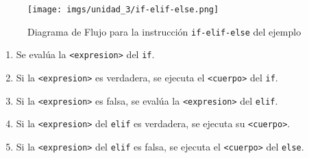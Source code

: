 \documentclass[
  letterpaper,
  DIV=11,
  numbers=noendperiod]{scrreprt}
\providecommand{\tightlist}{%
  \setlength{\itemsep}{0pt}\setlength{\parskip}{0pt}}\usepackage{longtable,booktabs,array}
\begin{document}
\begin{figure}[H]

{\centering \texttt{[image: imgs/unidad\_3/if-elif-else.png]}

}

\caption{Diagrama de Flujo para la instrucción \texttt{if-elif-else} del
ejemplo}

\end{figure}%

\begin{enumerate}
\def\labelenumi{\arabic{enumi}.}
\tightlist
\item
  Se evalúa la \texttt{\textless{}expresion\textgreater{}} del
  \texttt{if}.
\item
  Si la \texttt{\textless{}expresion\textgreater{}} es verdadera, se
  ejecuta el \texttt{\textless{}cuerpo\textgreater{}} del \texttt{if}.
\item
  Si la \texttt{\textless{}expresion\textgreater{}} es falsa, se evalúa
  la \texttt{\textless{}expresion\textgreater{}} del \texttt{elif}.
\item
  Si la \texttt{\textless{}expresion\textgreater{}} del \texttt{elif} es
  verdadera, se ejecuta su \texttt{\textless{}cuerpo\textgreater{}}.
\item
  Si la \texttt{\textless{}expresion\textgreater{}} del \texttt{elif} es
  falsa, se ejecuta el \texttt{\textless{}cuerpo\textgreater{}} del
  \texttt{else}.
\end{enumerate}
\end{document}
